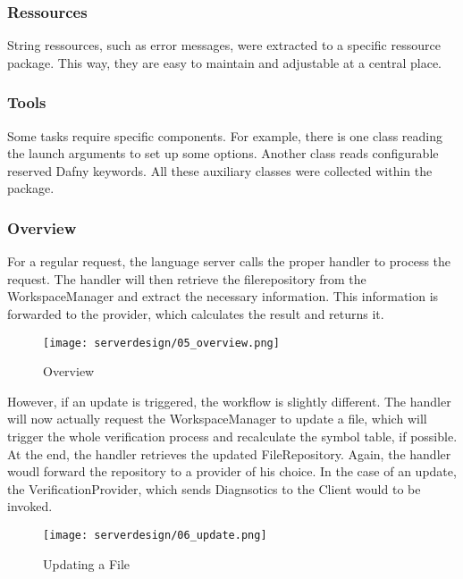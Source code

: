 \subsubsection{Ressources}
String ressources, such as error messages, were extracted to a specific ressource package. This way, they are easy to maintain and adjustable at a central place.

\subsubsection{Tools}
Some tasks require specific components. For example, there is one class reading the launch arguments to set up some options. Another class reads configurable reserved Dafny keywords. All these auxiliary classes were collected within the  package.

\subsubsection{Overview}
For a regular request, the language server calls the proper handler to process the request. The handler will then retrieve the filerepository from the WorkspaceManager and extract the necessary information. This information is forwarded to the provider, which calculates the result and returns it.

\begin{figure}[H]
    \centering
    \texttt{[image: serverdesign/05\_overview.png]}
    \caption{Overview}
    \label{fig:server_overview}
\end{figure}


However, if an update is triggered, the workflow is slightly different. The handler will now actually request the WorkspaceManager to update a file, which will trigger the whole verification process and recalculate the symbol table, if possible. At the end, the handler retrieves the updated FileRepository. Again, the handler woudl forward the repository to a provider of his choice. In the case of an update, the VerificationProvider, which sends Diagnsotics to the Client would to be invoked.

\begin{figure}[H]
    \centering
    \texttt{[image: serverdesign/06\_update.png]}
    \caption{Updating a File}
    \label{fig:server_update}
\end{figure}


